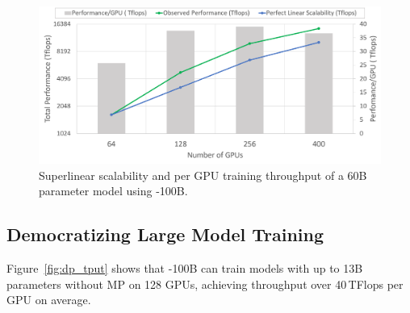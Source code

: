 \begin{figure}[t!]
   \begin{center}
   \includegraphics[width=1.0\columnwidth]{hyperscale_60B_model_v2.PNG}
   \caption{Superlinear scalability and per GPU training throughput of a 60B parameter model using \name-100B.} 
   \label{fig:hyperscale_60B}
   \end{center}
\end{figure}

\subsection{Democratizing Large Model Training}
Figure~\ref{fig:dp_tput} shows that \name-100B can train models with up to 13B parameters without MP on 128 GPUs, achieving throughput over 40\,TFlops per GPU on average.

